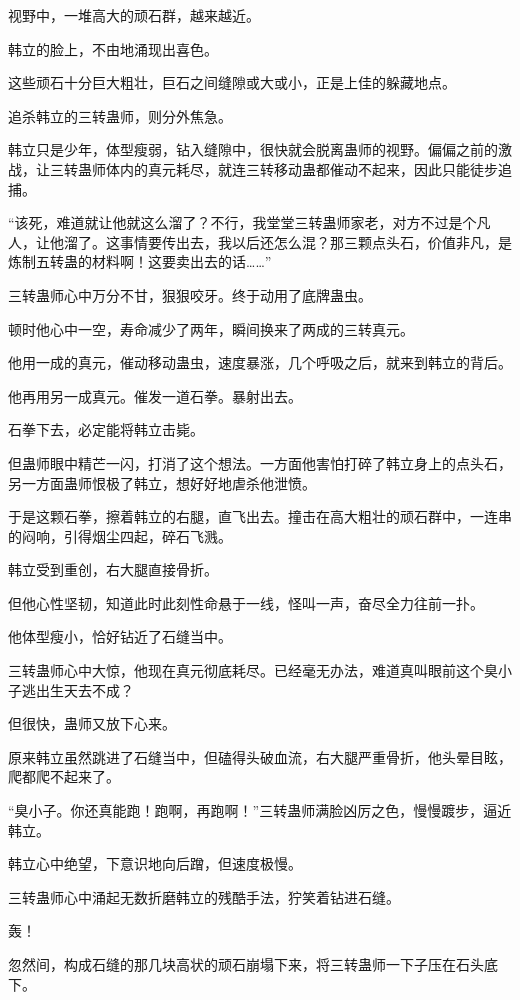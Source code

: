 \begin{this_body}
视野中，一堆高大的顽石群，越来越近。

韩立的脸上，不由地涌现出喜色。

这些顽石十分巨大粗壮，巨石之间缝隙或大或小，正是上佳的躲藏地点。

追杀韩立的三转蛊师，则分外焦急。

韩立只是少年，体型瘦弱，钻入缝隙中，很快就会脱离蛊师的视野。偏偏之前的激战，让三转蛊师体内的真元耗尽，就连三转移动蛊都催动不起来，因此只能徒步追捕。

“该死，难道就让他就这么溜了？不行，我堂堂三转蛊师家老，对方不过是个凡人，让他溜了。这事情要传出去，我以后还怎么混？那三颗点头石，价值非凡，是炼制五转蛊的材料啊！这要卖出去的话……”

三转蛊师心中万分不甘，狠狠咬牙。终于动用了底牌蛊虫。

顿时他心中一空，寿命减少了两年，瞬间换来了两成的三转真元。

他用一成的真元，催动移动蛊虫，速度暴涨，几个呼吸之后，就来到韩立的背后。

他再用另一成真元。催发一道石拳。暴射出去。

石拳下去，必定能将韩立击毙。

但蛊师眼中精芒一闪，打消了这个想法。一方面他害怕打碎了韩立身上的点头石，另一方面蛊师恨极了韩立，想好好地虐杀他泄愤。

于是这颗石拳，擦着韩立的右腿，直飞出去。撞击在高大粗壮的顽石群中，一连串的闷响，引得烟尘四起，碎石飞溅。

韩立受到重创，右大腿直接骨折。

但他心性坚韧，知道此时此刻性命悬于一线，怪叫一声，奋尽全力往前一扑。

他体型瘦小，恰好钻近了石缝当中。

三转蛊师心中大惊，他现在真元彻底耗尽。已经毫无办法，难道真叫眼前这个臭小子逃出生天去不成？

但很快，蛊师又放下心来。

原来韩立虽然跳进了石缝当中，但磕得头破血流，右大腿严重骨折，他头晕目眩，爬都爬不起来了。

“臭小子。你还真能跑！跑啊，再跑啊！”三转蛊师满脸凶厉之色，慢慢踱步，逼近韩立。

韩立心中绝望，下意识地向后蹭，但速度极慢。

三转蛊师心中涌起无数折磨韩立的残酷手法，狞笑着钻进石缝。

轰！

忽然间，构成石缝的那几块高状的顽石崩塌下来，将三转蛊师一下子压在石头底下。


\end{this_body}
